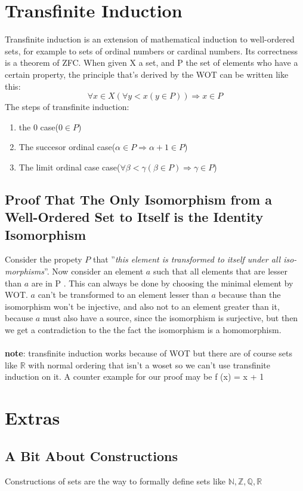 \documentclass{article}
\newcommand{\N}{\mathbb{N}}
\newcommand{\Z}{\mathbb{Z}}
\newcommand{\Q}{\mathbb{Q}}
\newcommand{\R}{\mathbb{R}}
\begin{document}
\section{Transfinite Induction}
Transfinite induction is an extension of mathematical induction to well-ordered
sets, for example to sets of ordinal numbers or cardinal numbers. Its correctness
is a theorem of ZFC. When given X a set, and P the set of elements who have
a certain property, the principle that’s derived by the WOT can be written like
this:
\[
	\forall x\in X(\forall y<x(y\in P)) \Rightarrow x\in P
\]
The steps of transfinite induction:
\begin{enumerate}
\item the 0 case($0\in P$)
\item The succesor ordinal case($\alpha\in P \Rightarrow \alpha+1\in P$)
\item The limit ordinal case case($\forall\beta<\gamma(\beta\in P)\Rightarrow \gamma\in P$)
\end{enumerate}
\subsection{Proof That The Only Isomorphism from a Well-Ordered Set to Itself is the Identity Isomorphism}
Consider the propety $P$ that ”\emph{this element is transformed to itself under all iso-
morphisms}”. Now consider an element $a$ such that all elements that are lesser
than $a$ are in P . This can always be done by choosing the minimal element
by WOT. $a$ can’t be transformed to an element lesser than $a$ because than
the isomorphism won’t be injective, and also not to an element greater than
it, because $a$ must also have a source, since the isomorphism is surjective, but
then we get a contradiction to the the fact the isomorphism is a homomorphism.
\\\\
\textbf{note}: transfinite induction works because of WOT but there are of course sets
like $\R$ with normal ordering that isn’t a woset so we can’t use transfinite induction on it. A counter example for our proof may be f (x) = x + 1
\newpage
\section{Extras}
\subsection{A Bit About Constructions}
Constructions of sets are the way to formally define sets like $\N,\Z,\Q,\R$
\end{document}
